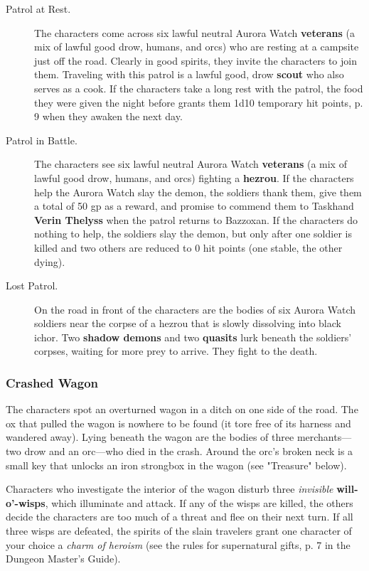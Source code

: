 \documentclass[letterpaper, 11pt, bg=full, twocolumn]{dndbook}
\begin{document}
\begin{description}
\item[Patrol at Rest.] The characters come across six lawful neutral Aurora Watch \textbf{veterans} (a mix of lawful good drow, humans, and orcs) who are resting at a campsite just off the road. Clearly in good spirits, they invite the characters to join them. Traveling with this patrol is a lawful good, drow \textbf{scout} who also serves as a cook. If the characters take a long rest with the patrol, the food they were given the night before grants them 1d10 temporary hit points, p. 9 when they awaken the next day.
\item[Patrol in Battle.] The characters see six lawful neutral Aurora Watch \textbf{veterans} (a mix of lawful good drow, humans, and orcs) fighting a \textbf{hezrou}. If the characters help the Aurora Watch slay the demon, the soldiers thank them, give them a total of 50 gp as a reward, and promise to commend them to Taskhand \textbf{Verin Thelyss} when the patrol returns to Bazzoxan. If the characters do nothing to help, the soldiers slay the demon, but only after one soldier is killed and two others are reduced to 0 hit points (one stable, the other dying).
\item[Lost Patrol.] On the road in front of the characters are the bodies of six Aurora Watch soldiers near the corpse of a hezrou that is slowly dissolving into black ichor. Two \textbf{shadow demons} and two \textbf{quasits} lurk beneath the soldiers' corpses, waiting for more prey to arrive. They fight to the death.
\end{description}

\subsubsection{Crashed Wagon}

The characters spot an overturned wagon in a ditch on one side of the road. The ox that pulled the wagon is nowhere to be found (it tore free of its harness and wandered away). Lying beneath the wagon are the bodies of three merchants---two drow and an orc---who died in the crash. Around the orc's broken neck is a small key that unlocks an iron strongbox in the wagon (see "Treasure" below).

Characters who investigate the interior of the wagon disturb three \textit{invisible} \textbf{will-o'-wisps}, which illuminate and attack. If any of the wisps are killed, the others decide the characters are too much of a threat and flee on their next turn. If all three wisps are defeated, the spirits of the slain travelers grant one character of your choice a \textit{charm of heroism} (see the rules for supernatural gifts, p. 7 in the Dungeon Master's Guide).
\end{document}
